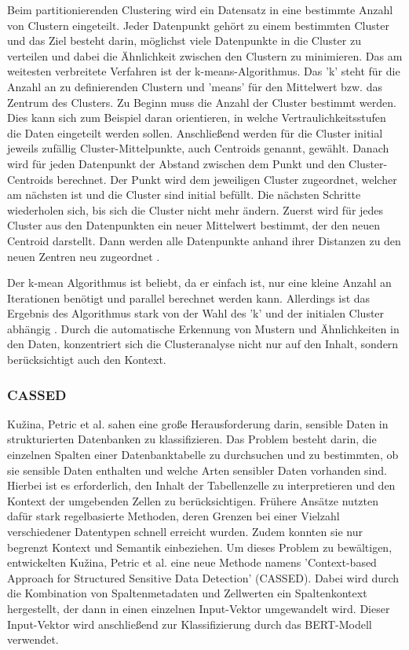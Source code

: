 Beim partitionierenden Clustering wird ein Datensatz in eine bestimmte Anzahl von Clustern eingeteilt. Jeder Datenpunkt gehört zu einem bestimmten Cluster und das Ziel besteht darin, möglichst viele Datenpunkte in die Cluster zu verteilen und dabei die Ähnlichkeit zwischen den Clustern zu minimieren. Das am weitesten verbreitete Verfahren ist der k-means-Algorithmus. Das 'k' steht für die Anzahl an zu definierenden Clustern und 'means' für den Mittelwert bzw. das Zentrum des Clusters. Zu Beginn muss die Anzahl der Cluster bestimmt werden. Dies kann sich zum Beispiel daran orientieren, in welche Vertraulichkeitsstufen die Daten eingeteilt werden sollen. Anschließend werden für die Cluster initial jeweils zufällig Cluster-Mittelpunkte, auch Centroids genannt, gewählt. Danach wird für jeden Datenpunkt der Abstand zwischen dem Punkt und den Cluster-Centroids berechnet. Der Punkt wird dem jeweiligen Cluster zugeordnet, welcher am nächsten ist und die Cluster sind initial befüllt. Die nächsten Schritte wiederholen sich, bis sich die Cluster nicht mehr ändern. Zuerst wird für jedes Cluster aus den Datenpunkten ein neuer Mittelwert bestimmt, der den neuen Centroid darstellt. Dann werden alle Datenpunkte anhand ihrer Distanzen zu den neuen Zentren neu zugeordnet \cite{Suyal.2014}.

Der k-mean Algorithmus ist beliebt, da er einfach ist, nur eine kleine Anzahl an Iterationen benötigt und parallel berechnet werden kann. Allerdings ist das Ergebnis des Algorithmus stark von der Wahl des 'k' und der initialen Cluster abhängig \cite{Suyal.2014}.
Durch die automatische Erkennung von Mustern und Ähnlichkeiten in den Daten, konzentriert sich die Clusteranalyse nicht nur auf den Inhalt, sondern berücksichtigt auch den Kontext.

\subsubsection{CASSED}
Kužina, Petric et al. \cite{Kuzina.2023} sahen eine große Herausforderung darin, sensible Daten in strukturierten Datenbanken zu klassifizieren. Das Problem besteht darin, die einzelnen Spalten einer Datenbanktabelle zu durchsuchen und zu bestimmten, ob sie sensible Daten enthalten und welche Arten sensibler Daten vorhanden sind. Hierbei ist es erforderlich, den Inhalt der Tabellenzelle zu interpretieren und den Kontext der umgebenden Zellen zu berücksichtigen. Frühere Ansätze nutzten dafür stark regelbasierte Methoden, deren Grenzen bei einer Vielzahl verschiedener Datentypen schnell erreicht wurden. Zudem konnten sie nur begrenzt Kontext und Semantik einbeziehen. Um dieses Problem zu bewältigen, entwickelten
Kužina, Petric et al. \cite{Kuzina.2023} eine neue Methode namens 'Context-based Approach for Structured Sensitive Data Detection' (CASSED). Dabei wird durch die Kombination von Spaltenmetadaten und Zellwerten ein Spaltenkontext hergestellt, der dann in einen einzelnen Input-Vektor umgewandelt wird. Dieser Input-Vektor wird anschließend zur Klassifizierung durch das BERT-Modell verwendet.


